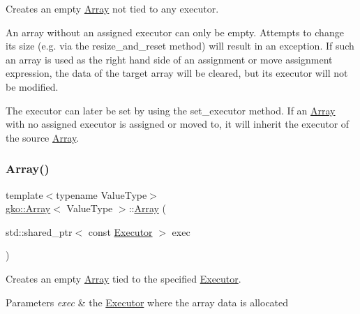 Creates an empty \hyperlink{classgko_1_1Array}{Array} not tied to any executor. 

An array without an assigned executor can only be empty. Attempts to change its size (e.\+g. via the resize\+\_\+and\+\_\+reset method) will result in an exception. If such an array is used as the right hand side of an assignment or move assignment expression, the data of the target array will be cleared, but its executor will not be modified.

The executor can later be set by using the set\+\_\+executor method. If an \hyperlink{classgko_1_1Array}{Array} with no assigned executor is assigned or moved to, it will inherit the executor of the source \hyperlink{classgko_1_1Array}{Array}. \mbox{\label{classgko_1_1Array_ae64e4c698ecef2cfbe3ceb3dfd07dbaf}} 
\subsubsection{\texorpdfstring{Array()}{Array()}\hspace{0.1cm}{\footnotesize\ttfamily [2/11]}}
{\footnotesize\ttfamily template$<$typename Value\+Type$>$ \\
\hyperlink{classgko_1_1Array}{gko\+::\+Array}$<$ Value\+Type $>$\+::\hyperlink{classgko_1_1Array}{Array} (\begin{DoxyParamCaption}\item[{std\+::shared\+\_\+ptr$<$ const \hyperlink{classgko_1_1Executor}{Executor} $>$}]{exec }\end{DoxyParamCaption})\hspace{0.3cm}{\ttfamily [noexcept]}}



Creates an empty \hyperlink{classgko_1_1Array}{Array} tied to the specified \hyperlink{classgko_1_1Executor}{Executor}. 


\begin{DoxyParams}{Parameters}
{\em exec} & the \hyperlink{classgko_1_1Executor}{Executor} where the array data is allocated \\
\hline
\end{DoxyParams}
\mbox{\label{classgko_1_1Array_a2cf49c2f39cbad160982d731fcf74031}} 
